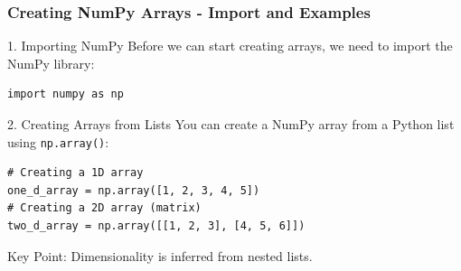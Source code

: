 \documentclass{beamer}
\begin{document}
\begin{frame}[fragile]
    \frametitle{Creating NumPy Arrays - Import and Examples}
    \begin{block}{1. Importing NumPy}
        Before we can start creating arrays, we need to import the NumPy library:
        \begin{lstlisting}
import numpy as np
        \end{lstlisting}
    \end{block}
    
    \begin{block}{2. Creating Arrays from Lists}
        You can create a NumPy array from a Python list using \texttt{np.array()}:
        \begin{lstlisting}
# Creating a 1D array
one_d_array = np.array([1, 2, 3, 4, 5])
# Creating a 2D array (matrix)
two_d_array = np.array([[1, 2, 3], [4, 5, 6]])
        \end{lstlisting}
        Key Point: Dimensionality is inferred from nested lists.
    \end{block}
\end{frame}
\end{document}
